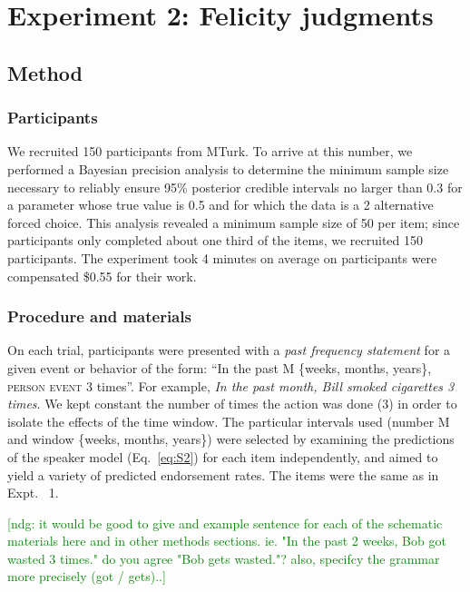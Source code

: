 \documentclass[10pt,letterpaper]{article}
\newcommand{\ndg}[1]{\textcolor{Green}{[ndg: #1]}}
\begin{document}

\section{Experiment 2: Felicity judgments}

\subsection{Method}

\subsubsection{Participants}

We recruited 150 participants from MTurk.
To arrive at this number, we performed a Bayesian precision analysis to determine the minimum sample size necessary to reliably ensure 95\% posterior credible intervals no larger than 0.3 for a parameter whose true value is 0.5 and for which the data is a 2 alternative forced choice. This analysis revealed a minimum sample size of 50 per item; since participants only completed about one third of the items, we recruited 150 participants.
The experiment took 4 minutes on average on participants were compensated \$0.55 for their work.

\subsubsection{Procedure and materials}

On each trial, participants were presented with a \emph{past frequency statement} for a given event or behavior of the form: ``In the past M \{weeks, months, years\}, \textsc{person} \textsc{event} 3 times''.
For example, \emph{In the past month, Bill smoked cigarettes 3 times}.
We kept constant the number of times the action was done (3) in order to isolate the effects of the time window. 
The particular intervals used (number M and window \{weeks, months, years\}) were selected by examining the predictions of the speaker model (Eq.~\ref{eq:S2}) for each item independently, and aimed to yield a variety of predicted endorsement rates.
The items were the same as in Expt. ~1.

\ndg{it would be good to give and example sentence for each of the schematic materials here and in other methods sections. ie. "In the past 2 weeks, Bob got wasted 3 times." do you agree "Bob gets wasted."?
also, specifcy the grammar more precisely (got / gets)..}
\end{document}
